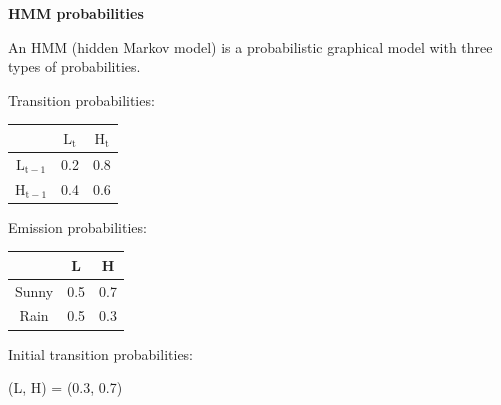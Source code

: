 \question \textbf{HMM probabilities}

An HMM (hidden Markov model) is a probabilistic graphical model with three types of probabilities.

\noindent
Transition probabilities:
\begin{table}[H]
\centering
\begin{tabular}{|c|c|c|}
\hline
     & $\mathrm{L_t}$  & $\mathrm{H_t}$  \\ \hline
$\mathrm{L_{t-1}}$ & 0.2 & 0.8 \\ \hline
$\mathrm{H_{t-1}}$ & 0.4 & 0.6 \\ \hline
\end{tabular}
\end{table}

\noindent
Emission probabilities:
\begin{table}[H]
\centering
\begin{tabular}{|c|c|c|}
\hline
     & L  & H  \\ \hline
Sunny & 0.5 & 0.7 \\ \hline
Rain & 0.5 & 0.3 \\ \hline
\end{tabular}
\end{table}

\noindent
Initial transition probabilities:
\begin{center}
(L, H) = (0.3, 0.7)
\end{center}

\vspace{0.1 in}


